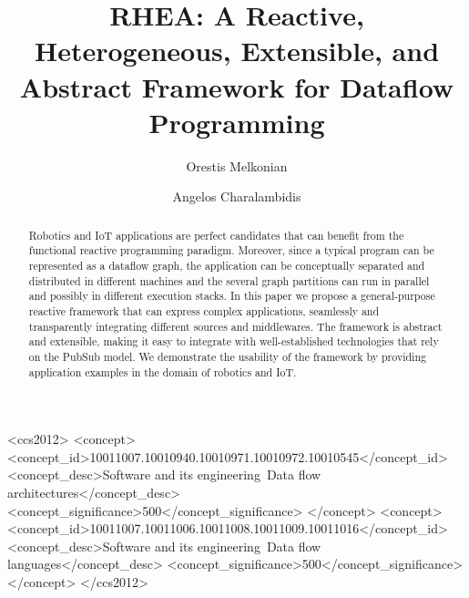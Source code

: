 \documentclass[sigplan,screen,10pt]{acmart}
\begin{document}
\sloppy %


\title[RHEA: A Reactive, Heterogeneous, Extensible, and Abstract Framework ...]
      {RHEA: A Reactive, Heterogeneous, Extensible, and Abstract Framework for Dataflow Programming}

\author{Orestis Melkonian}

\author{Angelos Charalambidis}

\begin{abstract}
Robotics and IoT applications are perfect candidates that can benefit from
the functional reactive programming paradigm. Moreover, since a typical
program can be represented as a dataflow graph, the application can be conceptually
separated and distributed in different machines and the several graph partitions
can run in parallel and possibly in different execution stacks. In this paper
we propose a general-purpose reactive framework that can express complex
applications, seamlessly and transparently integrating different sources and
middlewares. The framework is abstract and extensible, making it easy to integrate
with well-established technologies that rely on the PubSub model. We demonstrate
the usability of the framework by providing application examples in the domain of
robotics and IoT.
\end{abstract}

\begin{CCSXML} <ccs2012> <concept>
<concept_id>10011007.10010940.10010971.10010972.10010545</concept_id>
<concept_desc>Software and its engineering~Data flow
architectures</concept_desc> <concept_significance>500</concept_significance>
</concept> <concept>
<concept_id>10011007.10011006.10011008.10011009.10011016</concept_id>
<concept_desc>Software and its engineering~Data flow languages</concept_desc>
<concept_significance>500</concept_significance> </concept> </ccs2012>
\end{CCSXML}
\end{document}
